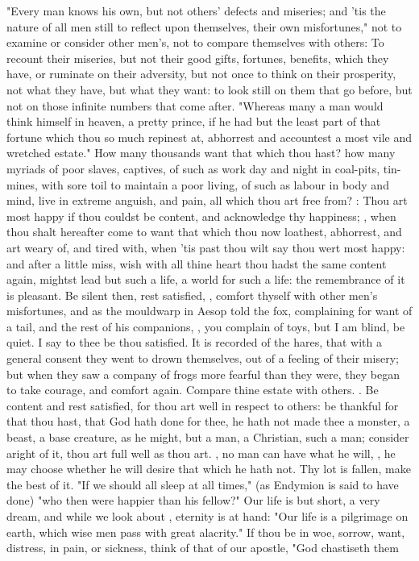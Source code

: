 {"Every man knows his own, but not others' defects and miseries; and 'tis the nature of all men still to reflect upon themselves, their own misfortunes," not to examine or consider other men's, not to compare themselves with others: To recount their miseries, but not their good gifts, fortunes, benefits, which they have, or ruminate on their adversity, but not once to think on their prosperity, not what they have, but what they want: to look still on them that go before, but not on those infinite numbers that come after. "Whereas many a man would think himself in heaven, a pretty prince, if he had but the least part of that fortune which thou so much repinest at, abhorrest and accountest a most vile and wretched estate." How many thousands want that which thou hast? how many myriads of poor slaves, captives, of such as work day and night in coal-pits, tin-mines, with sore toil to maintain a poor living, of such as labour in body and mind, live in extreme anguish, and pain, all which thou art free from? : Thou art most happy if thou couldst be content, and acknowledge thy happiness; , when thou shalt hereafter come to want that which thou now loathest, abhorrest, and art weary of, and tired with, when 'tis past thou wilt say thou wert most happy: and after a little miss, wish with all thine heart thou hadst the same content again, mightst lead but such a life, a world for such a life: the remembrance of it is pleasant. Be silent then, rest satisfied, , comfort thyself with other men's misfortunes, and as the mouldwarp in Aesop told the fox, complaining for want of a tail, and the rest of his companions, , you complain of toys, but I am blind, be quiet. I say to thee be thou satisfied. It is recorded of the hares, that with a general consent they went to drown themselves, out of a feeling of their misery; but when they saw a company of frogs more fearful than they were, they began to take courage, and comfort again. Compare thine estate with others. . Be content and rest satisfied, for thou art well in respect to others: be thankful for that thou hast, that God hath done for thee, he hath not made thee a monster, a beast, a base creature, as he might, but a man, a Christian, such a man; consider aright of it, thou art full well as thou art. , no man can have what he will, , he may choose whether he will desire that which he hath not. Thy lot is fallen, make the best of it. "If we should all sleep at all times," (as Endymion is said to have done) "who then were happier than his fellow?" Our life is but short, a very dream, and while we look about , eternity is at hand: "Our life is a pilgrimage on earth, which wise men pass with great alacrity." If thou be in woe, sorrow, want, distress, in pain, or sickness, think of that of our apostle, "God chastiseth them }

